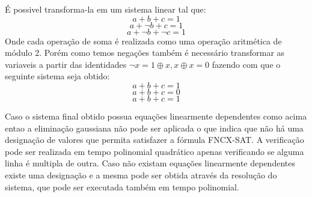 \documentclass[12pt]{article}
\begin{document}
\begin{enumerate}
{    É possivel transforma-la em um sistema linear tal que:
        \[ a + b + c = 1\]
        \[ a + \neg b + c = 1\]
        \[ a + \neg b + \neg c = 1\]
    Onde cada operação de soma é realizada como uma operação aritmética de módulo 2. Porém como temos negações também é necessário transformar as variaveis a partir das identidades \(\neg x = 1 \oplus x , x \oplus x = 0 \) fazendo com que o seguinte sistema seja obtido:
        \[ a + b + c = 1\]
        \[ a + b + c = 0\]
        \[ a + b + c = 1\]
    
    Caso o sistema final obtido possua equações linearmente dependentes como acima entao a eliminação gaussiana não pode ser aplicada o que indica que não há uma designação de valores que permita satisfazer a fórmula FNCX-SAT. A verificação pode ser realizada em tempo polinomial quadrático apenas verificando se alguma linha é multipla de outra. Caso não existam equações linearmente dependentes existe uma designação e a mesma pode ser obtida através da resolução do sistema, que pode ser executada também em tempo polinomial. 
  }
\end{enumerate}
\end{document}
